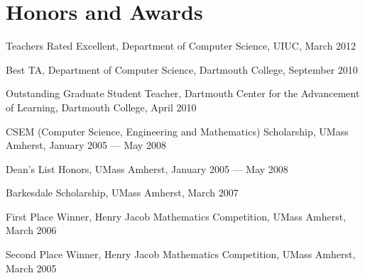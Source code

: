 \section{\sc Honors and Awards}
Teachers Rated Excellent, Department of Computer Science, UIUC, March 2012
\vspace*{-2.5mm}

Best TA, Department of Computer Science, Dartmouth College, September 2010
\vspace*{-2.5mm}

Outstanding Graduate Student Teacher, Dartmouth
Center for the Advancement of Learning, Dartmouth College, April 2010
\vspace*{-2.5mm}

CSEM (Computer Science, Engineering and Mathematics) Scholarship,
UMass Amherst, January 2005 --- May 2008
\vspace*{-2.5mm}

Dean's List Honors, UMass Amherst, January 2005 --- May 2008
\vspace*{-2.5mm}

Barkesdale Scholarship, UMass Amherst, March 2007
\vspace*{-2.5mm}

First Place Winner, Henry Jacob Mathematics
Competition, UMass Amherst, March 2006
\vspace*{-2.5mm}

Second Place Winner, Henry Jacob Mathematics
Competition, UMass Amherst, March 2005
\vspace*{-2.5mm}
